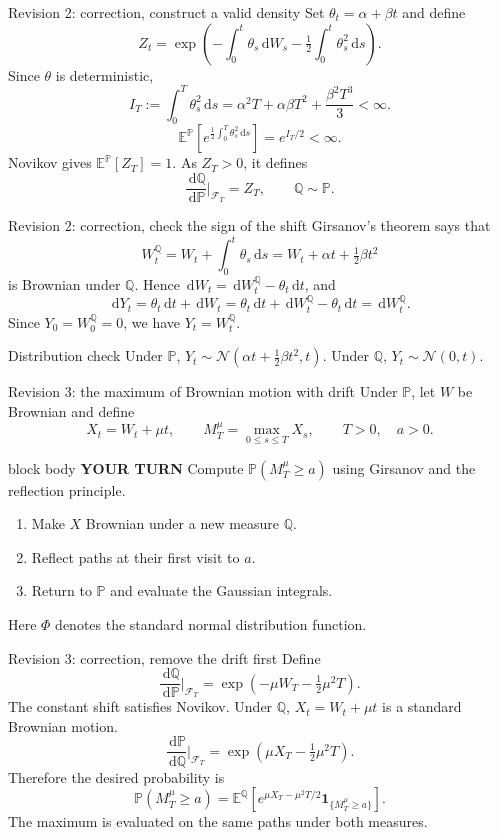 \documentclass[handout,10pt,aspectratio=169]{beamer}
\newenvironment{pausebox}{\begin{beamercolorbox}[rounded=true,sep=0.8em,wd=\textwidth]{block body}
  \textbf{\color{CourseGold}YOUR TURN}\quad}{\end{beamercolorbox}}
\newcommand{\dd}{\,\mathrm d}
\newcommand{\E}{\mathbb E}
\newcommand{\Pp}{\mathbb P}
\newcommand{\Q}{\mathbb Q}
\newcommand{\cF}{\mathcal F}
\newcommand{\1}{\mathbf 1}
\newcommand{\Nlaw}{\mathcal N}
\begin{document}
\begin{frame}{Revision 2: correction, construct a valid density}
Set \(\theta_t=\alpha+\beta t\) and define
\[
Z_t=\exp\!\left(-\int_0^t\theta_s\dd W_s
-\tfrac12\int_0^t\theta_s^2\dd s\right).
\]
Since \(\theta\) is deterministic,
\[
I_T:=\int_0^T\theta_s^2\dd s
=\alpha^2T+\alpha\beta T^2+\frac{\beta^2T^3}{3}<\infty.
\]
\[
\E^\Pp\!\left[e^{\frac12\int_0^T\theta_s^2\dd s}\right]
=e^{I_T/2}<\infty.
\]
Novikov gives \(\E^\Pp[Z_T]=1\). As \(Z_T>0\), it defines
\[
\boxed{\frac{\dd\Q}{\dd\Pp}\bigg|_{\cF_T}=Z_T,\qquad\Q\sim\Pp.}
\]
\end{frame}

\begin{frame}{Revision 2: correction, check the sign of the shift}
Girsanov's theorem says that
\[
\boxed{W_t^\Q=W_t+\int_0^t\theta_s\dd s
=W_t+\alpha t+\tfrac12\beta t^2}
\]
is Brownian under \(\Q\). Hence \(\dd W_t=\dd W_t^\Q-\theta_t\dd t\), and
\[
\dd Y_t=\theta_t\dd t+\dd W_t
=\theta_t\dd t+\dd W_t^\Q-\theta_t\dd t
=\dd W_t^\Q.
\]
Since \(Y_0=W_0^\Q=0\), we have \(Y_t=W_t^\Q\).
\begin{block}{Distribution check}
Under \(\Pp\), \(Y_t\sim\Nlaw(\alpha t+\tfrac12\beta t^2,t)\).
Under \(\Q\), \(Y_t\sim\Nlaw(0,t)\).
\end{block}
\end{frame}

\begin{frame}{Revision 3: the maximum of Brownian motion with drift}
Under \(\Pp\), let \(W\) be Brownian and define
\[
X_t=W_t+\mu t,\qquad M_T^\mu=\max_{0\le s\le T}X_s,
\qquad T>0,\quad a>0.
\]
\begin{pausebox}
Compute \(\Pp(M_T^\mu\ge a)\) using Girsanov and the reflection principle.
\end{pausebox}
\begin{enumerate}
  \item Make \(X\) Brownian under a new measure \(\Q\).
  \item Reflect paths at their first visit to \(a\).
  \item Return to \(\Pp\) and evaluate the Gaussian integrals.
\end{enumerate}
Here \(\Phi\) denotes the standard normal distribution function.
\end{frame}

\begin{frame}{Revision 3: correction, remove the drift first}
Define
\[
\frac{\dd\Q}{\dd\Pp}\bigg|_{\cF_T}
=\exp\!\left(-\mu W_T-\tfrac12\mu^2T\right).
\]
The constant shift satisfies Novikov. Under \(\Q\),
\(X_t=W_t+\mu t\) is a standard Brownian motion.
\[
\frac{\dd\Pp}{\dd\Q}\bigg|_{\cF_T}
=\exp\!\left(\mu X_T-\tfrac12\mu^2T\right).
\]
Therefore the desired probability is
\[
\boxed{\Pp(M_T^\mu\ge a)
=\E^\Q\!\left[e^{\mu X_T-\mu^2T/2}
\1_{\{M_T^\mu\ge a\}}\right].}
\]
The maximum is evaluated on the same paths under both measures.
\end{frame}
\end{document}
